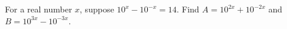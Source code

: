 For a real number $x$, suppose $10^x-10^{-x}=14$. Find $A=10^{2x}+10^{-2x}$ and $B=10^{3x}-10^{-3x}$.
